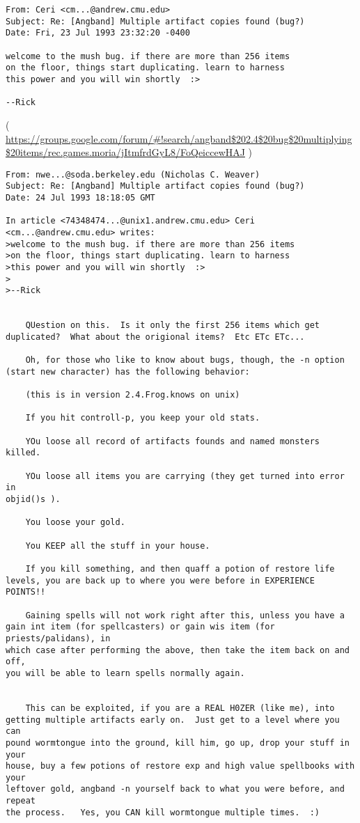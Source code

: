 \begin{lstlisting}
From: Ceri <cm...@andrew.cmu.edu>
Subject: Re: [Angband] Multiple artifact copies found (bug?)
Date: Fri, 23 Jul 1993 23:32:20 -0400

welcome to the mush bug. if there are more than 256 items
on the floor, things start duplicating. learn to harness
this power and you will win shortly  :>

--Rick
\end{lstlisting}
( \url{https://groups.google.com/forum/#!search/angband$202.4$20bug$20multiplying$20items/rec.games.moria/jItmfrdGyL8/FoQeiccewHAJ} )

\begin{lstlisting}
From: nwe...@soda.berkeley.edu (Nicholas C. Weaver)
Subject: Re: [Angband] Multiple artifact copies found (bug?)
Date: 24 Jul 1993 18:18:05 GMT

In article <74348474...@unix1.andrew.cmu.edu> Ceri <cm...@andrew.cmu.edu> writes:
>welcome to the mush bug. if there are more than 256 items
>on the floor, things start duplicating. learn to harness
>this power and you will win shortly  :>
>
>--Rick


	QUestion on this.  Is it only the first 256 items which get
duplicated?  What about the origional items?  Etc ETc ETc...

	Oh, for those who like to know about bugs, though, the -n option
(start new character) has the following behavior:

	(this is in version 2.4.Frog.knows on unix)

	If you hit controll-p, you keep your old stats.

	YOu loose all record of artifacts founds and named monsters killed.

	YOu loose all items you are carrying (they get turned into error in
objid()s ).

	You loose your gold.

	You KEEP all the stuff in your house.

	If you kill something, and then quaff a potion of restore life
levels, you are back up to where you were before in EXPERIENCE POINTS!!

	Gaining spells will not work right after this, unless you have a
gain int item (for spellcasters) or gain wis item (for priests/palidans), in
which case after performing the above, then take the item back on and off,
you will be able to learn spells normally again.


	This can be exploited, if you are a REAL H0ZER (like me), into
getting multiple artifacts early on.  Just get to a level where you can
pound wormtongue into the ground, kill him, go up, drop your stuff in your
house, buy a few potions of restore exp and high value spellbooks with your
leftover gold, angband -n yourself back to what you were before, and repeat
the process.   Yes, you CAN kill wormtongue multiple times.  :)


\end{lstlisting}
